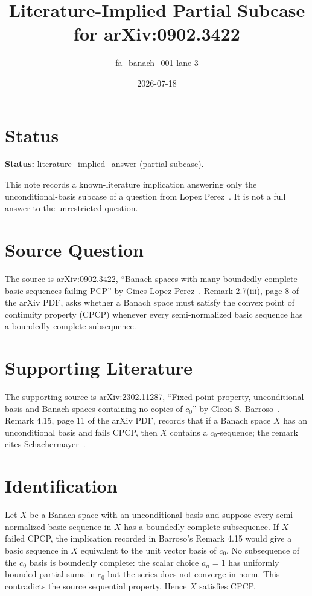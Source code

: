 \documentclass[11pt]{article}
\title{Literature-Implied Partial Subcase for arXiv:0902.3422}
\author{fa\_banach\_001 lane 3}
\date{2026-07-18}
\begin{document}
\maketitle

\section*{Status}

\textbf{Status:} literature\_implied\_answer (partial subcase).

This note records a known-literature implication answering only the unconditional-basis subcase of a question from Lopez Perez~\cite{Lopez2009}. It is not a full answer to the unrestricted question.

\section*{Source Question}

The source is arXiv:0902.3422, ``Banach spaces with many boundedly complete basic sequences failing PCP'' by Gines Lopez Perez~\cite{Lopez2009}. Remark 2.7(iii), page 8 of the arXiv PDF, asks whether a Banach space must satisfy the convex point of continuity property (CPCP) whenever every semi-normalized basic sequence has a boundedly complete subsequence.

\section*{Supporting Literature}

The supporting source is arXiv:2302.11287, ``Fixed point property, unconditional basis and Banach spaces containing no copies of \(c_0\)'' by Cleon S. Barroso~\cite{Barroso2023}. Remark 4.15, page 11 of the arXiv PDF, records that if a Banach space \(X\) has an unconditional basis and fails CPCP, then \(X\) contains a \(c_0\)-sequence; the remark cites Schachermayer~\cite[Corollary 2.11]{Schachermayer1987}.

\section*{Identification}

Let \(X\) be a Banach space with an unconditional basis and suppose every semi-normalized basic sequence in \(X\) has a boundedly complete subsequence. If \(X\) failed CPCP, the implication recorded in Barroso's Remark 4.15 would give a basic sequence in \(X\) equivalent to the unit vector basis of \(c_0\). No subsequence of the \(c_0\) basis is boundedly complete: the scalar choice \(a_n=1\) has uniformly bounded partial sums in \(c_0\) but the series does not converge in norm. This contradicts the source sequential property. Hence \(X\) satisfies CPCP.
\end{document}
